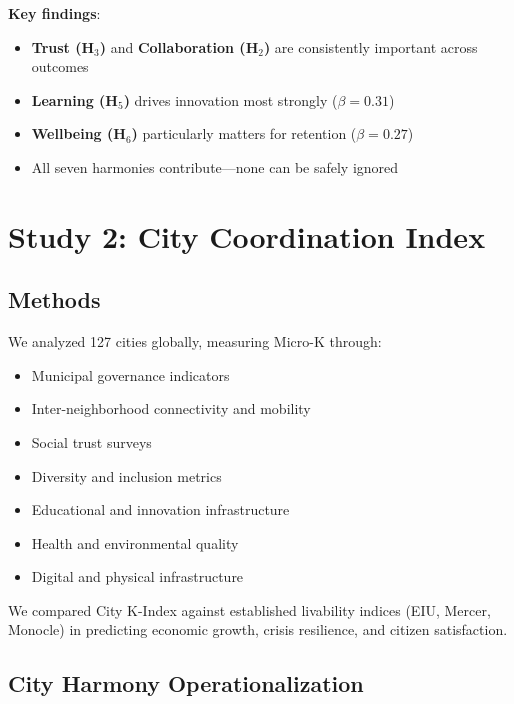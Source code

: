 \documentclass[12pt,a4paper]{article}
\begin{document}
\textbf{Key findings}:
\begin{itemize}
    \item \textbf{Trust (H$_3$)} and \textbf{Collaboration (H$_2$)} are consistently important across outcomes
    \item \textbf{Learning (H$_5$)} drives innovation most strongly ($\beta = 0.31$)
    \item \textbf{Wellbeing (H$_6$)} particularly matters for retention ($\beta = 0.27$)
    \item All seven harmonies contribute---none can be safely ignored
\end{itemize}

\section{Study 2: City Coordination Index}
\label{sec:study2}

\subsection{Methods}

We analyzed 127 cities globally, measuring Micro-K through:

\begin{itemize}
    \item Municipal governance indicators
    \item Inter-neighborhood connectivity and mobility
    \item Social trust surveys
    \item Diversity and inclusion metrics
    \item Educational and innovation infrastructure
    \item Health and environmental quality
    \item Digital and physical infrastructure
\end{itemize}

We compared City K-Index against established livability indices (EIU, Mercer, Monocle) in predicting economic growth, crisis resilience, and citizen satisfaction.

\subsection{City Harmony Operationalization}
\end{document}
